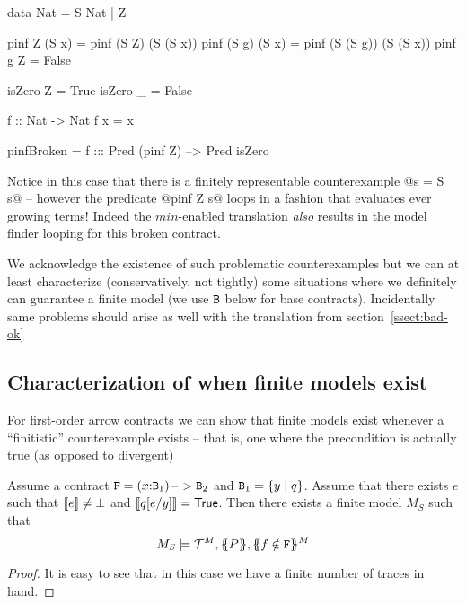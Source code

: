 \documentclass[preprint]{sigplanconf}
\begin{document}
\begin{code}
data Nat = S Nat | Z

pinf Z (S x) = pinf (S Z) (S (S x))
pinf (S g) (S x) = pinf (S (S g)) (S (S x))
pinf g Z     = False

isZero Z = True
isZero _ = False

f :: Nat -> Nat
f x = x

pinfBroken = f ::: Pred (pinf Z) --> Pred isZero
\end{code}

Notice in this case that there is a finitely representable
counterexample @s = S s@ -- however the predicate 
@pinf Z s@ loops in a fashion that evaluates ever growing terms! Indeed
the $min$-enabled translation {\em also} results in the model finder 
looping for this broken contract.

We acknowledge the existence of such problematic counterexamples but
we can at least characterize (conservatively, not tightly) some
situations where we definitely can guarantee a finite model (we use ${\tt B}$ below
for base contracts). Incidentally same problems should arise as well with the
translation from section~\ref{ssect:bad-ok}

\subsection{Characterization of when finite models exist}

For first-order arrow contracts we can show that finite models exist whenever
a ``finitistic'' counterexample exists -- that is, one where the precondition
is actually true (as opposed to divergent)

\begin{theorem}
Assume a contract ${ \tt F} = (x{:}{\tt B}_1) -> {\tt B}_2$ and ${\tt B}_1 = \{ y \mid q \}$. Assume that there 
exists $e$ such that $[\![e]\!] \neq \bot$ and $[\![q[e/y]]\!] = \mathsf{True}$. Then there
exists a finite model $M_S$ such that 
\[   M_S \models \Th^M,\ptrans{}{P},\ctrans{}{}{f \notin \Ft}^M \]
\end{theorem}
\begin{proof}
It is easy to see that in this case we have a finite number of traces in hand.
\end{proof}

\end{document}
